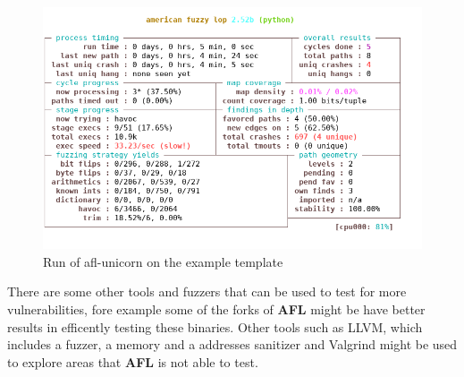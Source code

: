 \documentclass[../main.tex]{subfiles}
\begin{document}
\begin{figure}[htp]
  \centering
  \includegraphics[scale=0.75]{images/afl-unicorn-sample.png}
  \caption{Run of afl-unicorn on the example template}
  \label{fig:aflunicornres}
\end{figure}

There are some other tools and fuzzers that can be used to test for more
vulnerabilities, fore example some of the forks of \textbf{AFL} might be have better results in efficently testing these binaries. Other tools such as LLVM, which includes a fuzzer, a memory and a addresses sanitizer and Valgrind might be used to explore areas that \textbf{AFL} is not able to test.
\end{document}
